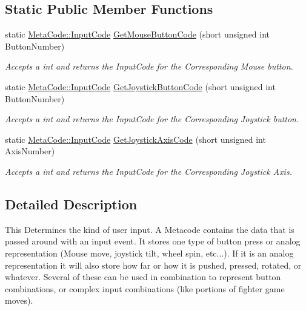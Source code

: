 \subsection*{Static Public Member Functions}
\begin{DoxyCompactItemize}
\item 
static \hyperlink{classphys_1_1MetaCode_a3e501cbb5bf0f6f1fdb7211465bda8d8}{MetaCode::InputCode} \hyperlink{classphys_1_1MetaCode_a4c5475be837b3ea5cc66223d53ca3e1a}{GetMouseButtonCode} (short unsigned int ButtonNumber)
\begin{DoxyCompactList}\small\item\em Accepts a int and returns the InputCode for the Corresponding Mouse button. \item\end{DoxyCompactList}\item 
static \hyperlink{classphys_1_1MetaCode_a3e501cbb5bf0f6f1fdb7211465bda8d8}{MetaCode::InputCode} \hyperlink{classphys_1_1MetaCode_a5e6e5f53b8c581b68a4b7e0a217032ca}{GetJoystickButtonCode} (short unsigned int ButtonNumber)
\begin{DoxyCompactList}\small\item\em Accepts a int and returns the InputCode for the Corresponding Joystick button. \item\end{DoxyCompactList}\item 
static \hyperlink{classphys_1_1MetaCode_a3e501cbb5bf0f6f1fdb7211465bda8d8}{MetaCode::InputCode} \hyperlink{classphys_1_1MetaCode_ac09685ca056e3c5423adeae712a3c436}{GetJoystickAxisCode} (short unsigned int AxisNumber)
\begin{DoxyCompactList}\small\item\em Accepts a int and returns the InputCode for the Corresponding Joystick Axis. \item\end{DoxyCompactList}\end{DoxyCompactItemize}


\subsection{Detailed Description}
This Determines the kind of user input. A Metacode contains the data that is passed around with an input event. It stores one type of button press or analog representation (Mouse move, joystick tilt, wheel spin, etc...). If it is an analog representation it will also store how far or how it is pushed, pressed, rotated, or whatever. Several of these can be used in combination to represent button combinations, or complex input combinations (like portions of fighter game moves). 

